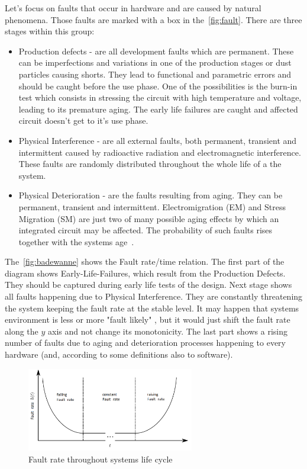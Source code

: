 Let's focus on faults that occur in hardware and are caused by natural phenomena. Those faults are marked with a box in the~\autoref{fig:fault}. There are three stages within this group:
\begin{itemize}
    \item Production defects - are all development faults which are permanent. These can be imperfections and variations in one of the production stages or dust particles causing shorts. They lead to functional and parametric errors and should be caught before the use phase. One of the possibilities is the burn-in test which consists in stressing the circuit with high temperature and voltage, leading to its premature aging. The early life failures are caught and affected circuit doesn't get to it's use phase.
    \item Physical Interference - are all external faults, both permanent, transient and intermittent caused by radioactive radiation and electromagnetic interference. These faults are randomly distributed throughout the whole life of a the system.
    \item Physical Deterioration - are the faults resulting from aging. They can be permanent, transient and intermittent. Electromigration (EM) and Stress Migration (SM) are just two of many possible aging effects by which an integrated circuit may be affected. The probability of such faults rises together with the systems age~\cite{art:Avizienis, art:Avizienis2}.
\end{itemize}
The~\autoref{fig:badewanne} shows the Fault rate/time relation. The first part of the diagram shows Early-Life-Failures, which result from the Production Defects. They should be captured during early life tests of the design. Next stage shows all faults happening due to Physical Interference. They are constantly threatening the system keeping the fault rate at the stable level. It may happen that systems environment is less or more "fault likely" , but it would just shift the fault rate along the $y$ axis and not change its monotonicity. The last part shows a rising number of faults due to aging and deterioration processes happening to every hardware (and, according to some definitions also to software).

\begin{figure}[H]
\centering
\includegraphics[width=0.65\textwidth]{figures/badewanne.png}
\caption{Fault rate throughout systems life cycle~\cite{art:Avizienis}}
\label{fig:badewanne}
\end{figure}


